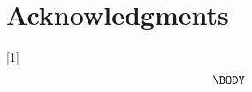 \documentclass{article}
\begin{document}
\section*{Acknowledgments}





 \newcommand{\be}{\begin{equation}}
 \newcommand{\ee}{\end{equation}}
 \newcommand{\bd}{\begin{displaymath}}
 \newcommand{\ed}{\end{displaymath}}
\newcommand{\IN}{\ensuremath{\mathds{N}}}%
\newcommand{\EE}[1]{\ensuremath{\mathds{E}\left[ #1 \right]}}%
\newcommand{\one}[1]{\ensuremath{\mathds{1}_{\left\{ #1 \right\}}}}%
\newcommand{\prb}[1]{\ensuremath{\mathds{P}\left( #1 \right) } }%

[1]{%
\begin{equation}
\label{#1}
\begin{split}
  \BODY
\end{split}\end{equation}
}

\setcounter{secnumdepth}{2} %

\appendix
\end{document}
